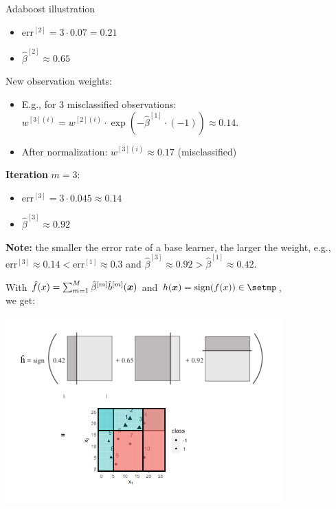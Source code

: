 \begin{vbframe}{Adaboost illustration}
\begin{minipage}[c]{0.6\textwidth}
\begin{footnotesize}
\begin{itemize}
    \item $\text{err}^{[2]} = 3 \cdot 0.07 = 0.21$ 
    \item $\hat{\beta}^{[2]} \approx 0.65$
  \end{itemize}
  New observation weights:
  \begin{itemize}
    \item E.g., for 3 misclassified observations:
      $w^{[3](i)} = w^{[2](i)} \cdot \exp \left(-\hat \beta^{[1]} \cdot (-1) 
      \right) \approx 0.14.$
    \item After normalization: $w^{[3](i)} \approx 0.17$ (misclassified)
  \end{itemize}
  \textbf{Iteration} $m = 3$:
  \begin{itemize}
    \item $\text{err}^{[3]} = 3 \cdot 0.045 \approx 0.14$ 
    \item $\hat{\beta}^{[3]} \approx 0.92$
  \end{itemize}
  \end{footnotesize}
\end{minipage}

\vfill

\begin{footnotesize}
\textbf{Note:} the smaller the error rate of a base learner, the larger the 
weight, e.g., $\text{err}^{[3]} \approx 0.14 < \text{err}^{[1]} \approx 0.3$ 
and $\hat \beta^{[3]} \approx 0.92 > \hat \beta^{[1]} \approx 0.42.$
\end{footnotesize}

\framebreak


With $\hat{f}(x) = \sum_{m=1}^{M} \hat{\beta}^{[m]} \hat{b}^{[m]}(\bm{x})$ and $h(\xv) = \text{sign}(\fx) 
\in \setmp$, \\we get:

\begin{center}
  \includegraphics[trim = 0 20 0 10, clip, width = 0.8\textwidth]{
  figure_man/adaboost_example_adjusted.PNG}
\end{center}


\end{vbframe}
